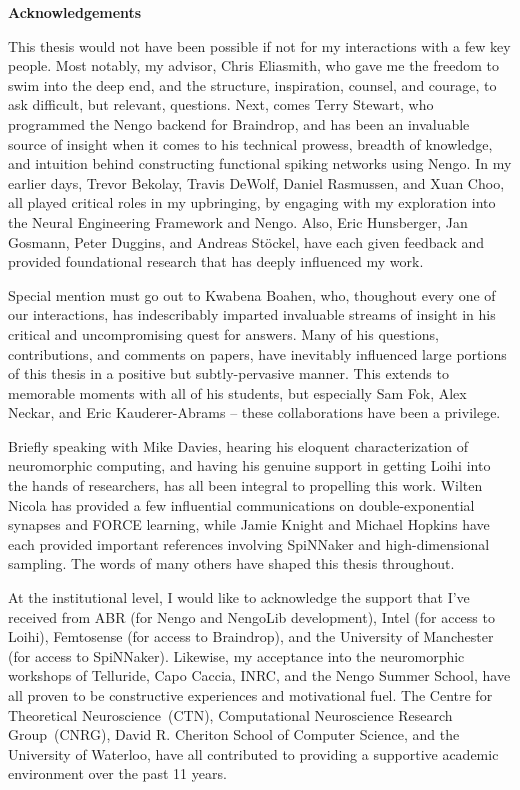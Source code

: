 {}
\begin{center}\textbf{Acknowledgements}\end{center}

This thesis would not have been possible if not for my interactions with a few key people.
Most notably, my advisor, Chris Eliasmith, who gave me the freedom to swim into the deep end, and the structure, inspiration, counsel, and courage, to ask difficult, but relevant, questions.
Next, comes Terry Stewart, who programmed the Nengo backend for Braindrop, and has been an invaluable source of insight when it comes to his technical prowess, breadth of knowledge, and intuition behind constructing functional spiking networks using Nengo.
In my earlier days, Trevor Bekolay, Travis DeWolf, Daniel Rasmussen, and Xuan Choo, all played critical roles in my upbringing, by engaging with my exploration into the Neural Engineering Framework and Nengo.
Also, Eric Hunsberger, Jan Gosmann, Peter Duggins, and Andreas St{\"o}ckel, have each given feedback and provided foundational research that has deeply influenced my work.

Special mention must go out to Kwabena Boahen, who, thoughout every one of our interactions, has indescribably imparted invaluable streams of insight in his critical and uncompromising quest for answers.
Many of his questions, contributions, and comments on papers, have inevitably influenced large portions of this thesis in a positive but subtly-pervasive manner.
This extends to memorable moments with all of his students, but especially Sam Fok, Alex Neckar, and Eric Kauderer-Abrams -- these collaborations have been a privilege.

Briefly speaking with Mike Davies, hearing his eloquent characterization of neuromorphic computing, and having his genuine support in getting Loihi into the hands of researchers, has all been integral to propelling this work.
Wilten Nicola has provided a few influential communications on double-exponential synapses and FORCE learning, while Jamie Knight and Michael Hopkins have each provided important references involving SpiNNaker and high-dimensional sampling.
The words of many others have shaped this thesis throughout.

At the institutional level, I would like to acknowledge the support that I've received from
ABR (for Nengo and NengoLib development),
Intel (for access to Loihi),
Femtosense (for access to Braindrop),
and the University of Manchester (for access to SpiNNaker).
Likewise, my acceptance into the neuromorphic workshops of Telluride, Capo Caccia, INRC, and the Nengo Summer School, have all proven to be constructive experiences and motivational fuel.
The Centre for Theoretical Neuroscience~(CTN), Computational Neuroscience Research Group~(CNRG), David R. Cheriton School of Computer Science, and the University of Waterloo, have all contributed to providing a supportive academic environment over the past 11 years.  

